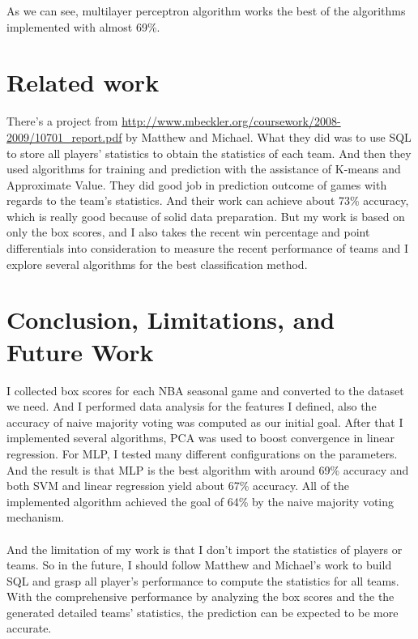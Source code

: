 \documentclass{article}
\begin{document}
As we can see, multilayer perceptron algorithm works the best of the algorithms implemented with almost 69\%.

\section{Related work}
There's a project from \url{http://www.mbeckler.org/coursework/2008-2009/10701_report.pdf}  by Matthew and Michael. What they did was to use SQL to store all players' statistics to obtain the statistics of each team. And then they used algorithms for training and prediction with the assistance of K-means and Approximate Value. They did good job in prediction outcome of games with regards to the team's statistics. And their work can achieve about 73\% accuracy, which is really good because of solid data preparation. But my work is based on only the box scores, and I also takes the recent win percentage and point differentials into consideration to measure the recent performance of teams and I explore several algorithms for the best classification method.

\section {Conclusion, Limitations, and Future Work}
I collected box scores for each NBA seasonal game and converted to the dataset we need. And I  performed data analysis for the features I defined, also the accuracy of naive majority voting was computed as our initial goal. After that I implemented several algorithms, PCA was used to boost convergence in linear regression. For MLP, I tested many different configurations on the parameters.  And the result is that MLP is the best algorithm with around 69\% accuracy and both SVM and linear regression yield about 67\% accuracy. All of the implemented algorithm achieved the goal of 64\% by the naive majority voting mechanism. 
\\
\\
And the limitation of my work is that I don't import the statistics of players or teams. So in the future, I should follow Matthew and Michael's work to build SQL and grasp all player's performance to compute the statistics for all teams. With the comprehensive performance by analyzing the box scores and the the generated detailed teams' statistics, the prediction can be expected to be more accurate.
\nocite{langley00}



\end{document}
